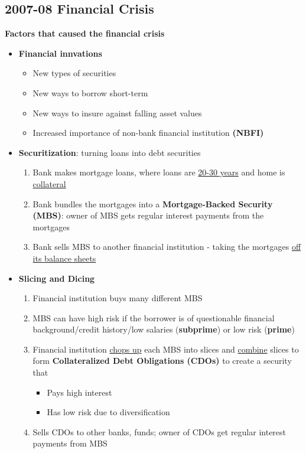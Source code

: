 \documentclass{article}
\begin{document}
\begin{multicols}{2}
\subsection{2007-08 Financial Crisis}
\textbf{Factors that caused the financial crisis}
\begin{itemize}
	\item \textbf{Financial innvations}
	\begin{itemize}
		\item New types of securities
		\item New ways to borrow short-term
		\item New ways to insure against falling asset values
		\item Increased importance of non-bank financial institution \textbf{(NBFI)}
	\end{itemize}
    \item \textbf{Securitization}: turning loans into debt securities
    \begin{enumerate}
    	\item Bank makes mortgage loans, where loans are \underline{20-30 years} and home is \underline{collateral}
    	\item Bank bundles the mortgages into a \textbf{Mortgage-Backed Security (MBS)}: owner of MBS gets regular interest payments from the mortgages
    	\item Bank sells MBS to another financial institution - taking the mortgages \underline{off its balance sheets}
    \end{enumerate}
    \item \textbf{Slicing and Dicing}
    \begin{enumerate}
    	\item Financial institution buys many different MBS
    	\item MBS can have high risk if the borrower is of questionable financial background/credit history/low salaries (\textbf{subprime}) or low risk (\textbf{prime})
    	\item Financial institution \underline{chops up} each MBS into slices and \underline{combine} slices to form \textbf{Collateralized Debt Obligations (CDOs)} to create a security that
    	\begin{itemize}
    		\item Pays high interest
    		\item Has low risk due to diversification
    	\end{itemize}
        \item Sells CDOs to other banks, funds; owner of CDOs get regular interest payments from MBS

\end{enumerate}
\end{itemize}
\end{multicols}
\end{document}
